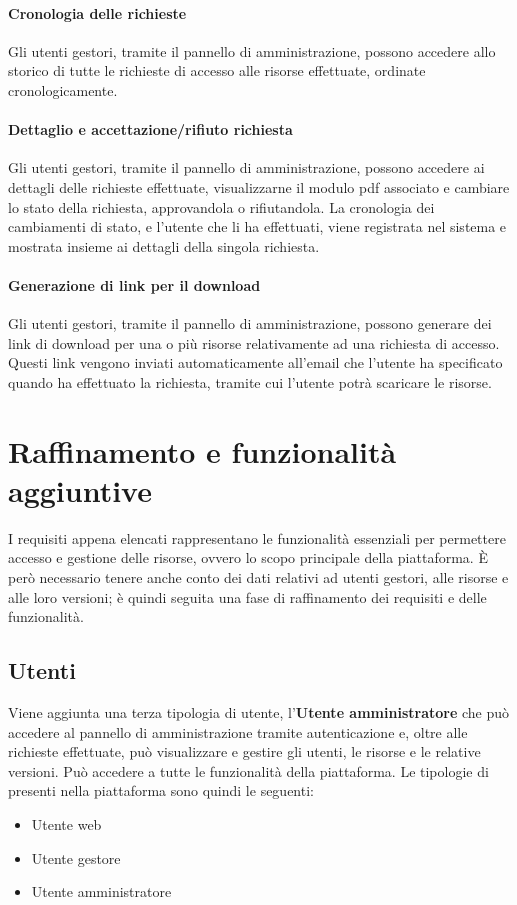 \paragraph{Cronologia delle richieste}
Gli utenti gestori, tramite il pannello di amministrazione, possono accedere allo
storico di tutte le richieste di accesso alle risorse effettuate, ordinate
cronologicamente.

\paragraph{Dettaglio e accettazione/rifiuto richiesta}
Gli utenti gestori, tramite il pannello di amministrazione, possono accedere ai
dettagli delle richieste effettuate, visualizzarne il modulo pdf associato e
cambiare lo stato della richiesta, approvandola o rifiutandola.
La cronologia dei cambiamenti di stato, e l'utente che li ha effettuati, viene
registrata nel sistema e mostrata insieme ai dettagli della singola richiesta.

\paragraph{Generazione di link per il download}
Gli utenti gestori, tramite il pannello di amministrazione, possono generare dei
link di download per una o più risorse relativamente ad una richiesta di accesso.
Questi link vengono inviati automaticamente all'email che l'utente ha specificato
quando ha effettuato la richiesta, tramite cui l'utente potrà scaricare le risorse.



\section{Raffinamento e funzionalità aggiuntive}
I requisiti appena elencati rappresentano le funzionalità essenziali per permettere
accesso e gestione delle risorse, ovvero lo scopo principale della piattaforma.
È però necessario tenere anche conto dei dati relativi ad utenti gestori, alle
risorse e alle loro versioni; è quindi seguita una fase di raffinamento dei
requisiti e delle funzionalità.


\subsection{Utenti}
Viene aggiunta una terza tipologia di utente, l'\textbf{Utente amministratore}
che può accedere al pannello di amministrazione tramite autenticazione e, oltre
alle richieste effettuate, può visualizzare e gestire gli utenti, le risorse e
le relative versioni. Può accedere a tutte le funzionalità della piattaforma.
Le tipologie di presenti nella piattaforma sono quindi le seguenti:
\begin{itemize}
	\item Utente web
	\item Utente gestore
	\item Utente amministratore
\end{itemize}


